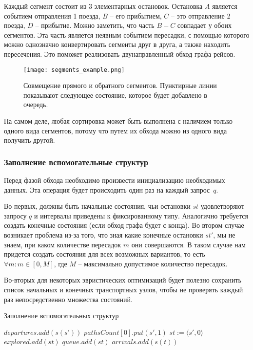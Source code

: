 Каждый сегмент состоит из 3 элементарных остановок. Остановка $A$ является событием отправления 1 поезда, $B$ -- его прибытием, $C$ -- это отправление 2 поезда, $D$ -- прибытие. Можно заметить, что часть $B-C$ совпадает у обоих сегментов. Эта часть является неявным событием пересадки, с помощью которого можно однозначно конвертировать сегменты друг в друга, а также находить пересечения. Это поможет реализовать двунаправленный обход графа рейсов.

\begin{figure}[!h]
	\centering
	\texttt{[image: segments\_example.png]}
	\caption{Совмещение прямого и обратного сегментов. Пунктирные линии показывают следующее состояние, которое будет добавлено в очередь.}\label{fig4}
\end{figure}

На самом деле, любая сортировка может быть выполнена с наличием только одного вида сегментов, потому что путем их обхода можно из одного вида получить другой.

\subsubsection{Заполнение вспомогательные структур}
Перед фазой обхода необходимо произвести инициализацию необходимых данных. Эта операция будет происходить один раз на каждый запрос~$q$.

Во-первых, должны быть начальные состояния, чьи остановки $st$ удовлетворяют запросу $q$ и интервалы приведены к фиксированному типу. Аналогично требуется создать конечные состояния (если обход графа будет с конца). Во втором случае возникает проблема из-за того, что зная какие конечные остановки $st'$, мы не знаем, при каком количестве пересадок $m$ они совершаются. В таком случае нам придется создать состояния для всех возможных вариантов, то есть $\forall m : m \in [0, M]$, где $M$ -- максимально допустимое количество пересадок. 

Во-вторых для некоторых эвристических оптимизаций будет полезно сохранить список начальных и конечных транспортных узлов, чтобы не проверять каждый раз непосредственно множества состояний.

\begin{algorithm}[!h]
	\caption{Заполнение вспомогательных структур}\label{lst5}
	\begin{algorithmic}
			\State $departures.add(s(s'))$ 
			\State $pathsCount[0].put(s', 1)$ 
			\State $st := \langle s', 0 \rangle$ 
			\State $explored.add(st)$ 
			\State $queue.add(st)$ 
		\EndFor
			\State $arrivals.add(s(t))$ 
		\EndFor
	\end{algorithmic}
\end{algorithm}

